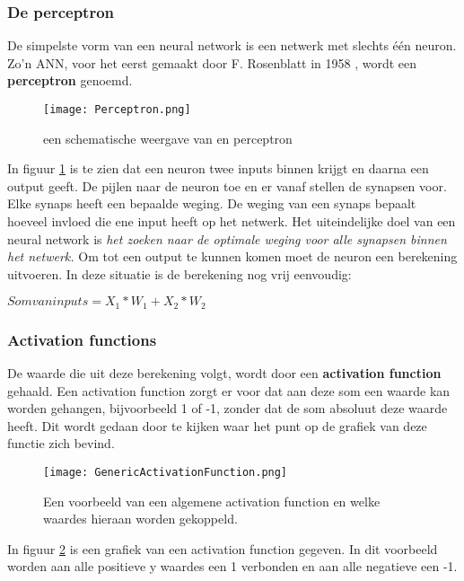 \subsubsection{De perceptron}
De simpelste vorm van een neural network is een netwerk met slechts \'{e}\'{e}n neuron. Zo'n ANN, voor het eerst gemaakt door  F. Rosenblatt in 1958 \cite{ANN1}, wordt een \textbf{perceptron} genoemd.

\begin{figure}[H]
  \centering
    \texttt{[image: Perceptron.png]}
  \caption{een schematische weergave van en perceptron}
  \label{fig:perceptron}
\end{figure}

In figuur \ref{fig:perceptron} is te zien dat een neuron twee inputs binnen krijgt en daarna een output geeft. De pijlen naar de neuron toe en er vanaf stellen de synapsen voor. Elke synaps heeft een bepaalde weging. De weging van een synaps bepaalt hoeveel invloed die ene input heeft op het netwerk. Het uiteindelijke doel van een neural network is \textit{het zoeken naar de optimale weging voor alle synapsen binnen het netwerk.} 
Om tot een output te kunnen komen moet de neuron een berekening uitvoeren. In deze situatie is de berekening nog vrij eenvoudig:

\begin{center}
$ Som van inputs = X_{1} * W_{1} + X_{2} * W_{2}$
\end{center}

\subsubsection{Activation functions}
De waarde die uit deze berekening volgt, wordt door een \textbf{activation function} gehaald. Een activation function zorgt er voor dat aan deze som een waarde kan worden gehangen, bijvoorbeeld 1 of -1, zonder dat de som absoluut deze waarde heeft. Dit wordt gedaan door te kijken waar het punt op de grafiek van deze functie zich bevind.

\begin{figure}[h]
  \centering
    \texttt{[image: GenericActivationFunction.png]}
  \caption{Een voorbeeld van een algemene activation function en welke waardes hieraan worden gekoppeld.}
  \label{fig:actFunction}
\end{figure}

In figuur \ref{fig:actFunction} is een grafiek van een activation function gegeven. In dit voorbeeld worden aan alle positieve y waardes een 1 verbonden en aan alle negatieve een -1.

